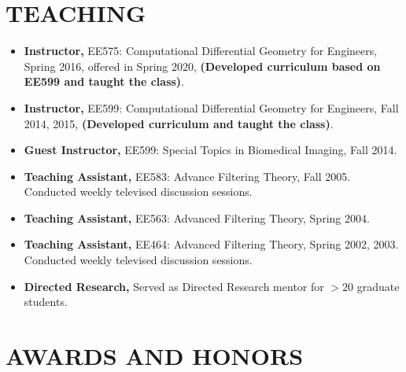 \documentclass[overlapped,line,letterpaper]{res}
\begin{document}
\begin{resume}
\begin{itemize}
\end{itemize}
\section{\bf TEACHING}
\begin{itemize}
\item \textbf{Instructor,} EE575: Computational Differential Geometry for Engineers, Spring 2016, offered in Spring 2020, \textbf{(Developed curriculum based on EE599 and taught the class)}. 
\item \textbf{Instructor,} EE599: Computational Differential Geometry for Engineers, Fall 2014, 2015, \textbf{(Developed curriculum and taught the class)}. 
\item \textbf{Guest Instructor,} EE599: Special Topics in Biomedical Imaging, Fall 2014. 
\item \textbf{Teaching Assistant,} EE583: Advance Filtering Theory, Fall 2005. Conducted weekly televised discussion sessions. 
\item \textbf{Teaching Assistant,} EE563: Advanced Filtering Theory, Spring 2004. 
\item \textbf{Teaching Assistant,} EE464: Advanced Filtering Theory, Spring 2002, 2003. Conducted weekly televised discussion sessions. 
\item \textbf{Directed Research,} Served as Directed Research mentor for $>20$ graduate students.

\end{itemize}

\section{\bf AWARDS AND HONORS}


\end{resume}
\end{document}
